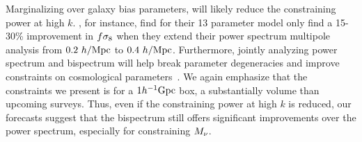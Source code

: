 Marginalizing over galaxy bias parameters, will likely reduce the constraining 
power at high $k$. \cite{hand2017}, for instance, find for their 13 parameter 
model only find a 15-30\% improvement in $f\sigma_8$ when they extend their power 
spectrum multipole analysis from $0.2~h/{\rm Mpc}$ to $0.4~h/{\rm Mpc}$. Furthermore, jointly 
analyzing power spectrum and bispectrum will help break parameter degeneracies 
and improve constraints on cosmological parameters~\citep{sefusatti2006, yankelevich2019}. 
We again emphasize that the constraints we present is for a $1h^{-1}{\rm Gpc}$ box, 
a substantially volume than upcoming surveys. Thus, even if the constraining 
power at high $k$ is reduced, our forecasts suggest that the bispectrum still 
offers significant improvements over the power spectrum, especially for 
constraining $M_\nu$. 
